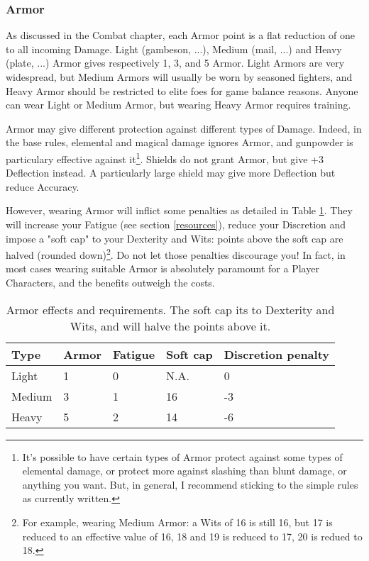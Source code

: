 \subsubsection{Armor}

\label{armor}

As discussed in the Combat chapter, each Armor point is a flat reduction of one to all incoming Damage. Light (gambeson, ...), Medium (mail, ...) and Heavy (plate, ...) Armor gives respectively 1, 3, and 5 Armor. Light Armors are very widespread, but Medium Armors will usually be worn by seasoned fighters, and Heavy Armor should be restricted to elite foes for game balance reasons. 
Anyone can wear Light or Medium Armor, but wearing Heavy Armor requires training.

Armor may give different protection against different types of Damage. Indeed, in the base rules, elemental and magical damage ignores Armor, and gunpowder is particulary effective against it\footnote{It's possible to have certain types of Armor protect against some types of elemental damage, or protect more against slashing than blunt damage, or anything you want. But, in general, I recommend sticking to the simple rules as currently written.}. Shields do not grant Armor, but give +3 Deflection instead. A particularly large shield may give more Deflection but reduce Accuracy.

However, wearing Armor will inflict some penalties as detailed in Table \ref{armor_effects}. They will increase your Fatigue (see section \ref{resources}), reduce your Discretion and impose a "soft cap" to your Dexterity and Wits: points above the soft cap are halved (rounded down)\footnote{For example, wearing Medium Armor: a Wits of 16 is still 16, but 17 is reduced to an effective value of 16, 18 and 19 is reduced to 17, 20 is redued to 18.}. Do not let those penalties discourage you! In fact, in most cases wearing suitable Armor is absolutely paramount for a Player Characters, and the benefits outweigh the costs.


\begin{table}[h!tbp]
	\begin{center}
		\begin{tabular}{p{1.2cm}p{1.1cm}p{1.2cm}p{1cm}p{1.7cm}} \toprule
			
			\textbf{Type} & \textbf{Armor} & \textbf{Fatigue} & \textbf{Soft cap} & \textbf{Discretion penalty} \\ \midrule
			
			Light & 1 & 0 & N.A. & 0\\
			Medium & 3 & 1 & 16 & -3 \\
			Heavy & 5 & 2 & 14 & -6 \\

			\bottomrule
		\end{tabular}
	\end{center}
	\caption{Armor effects and requirements. The soft cap its to Dexterity and Wits, and will halve the points above it.}
	\label{armor_effects}
\end{table}



